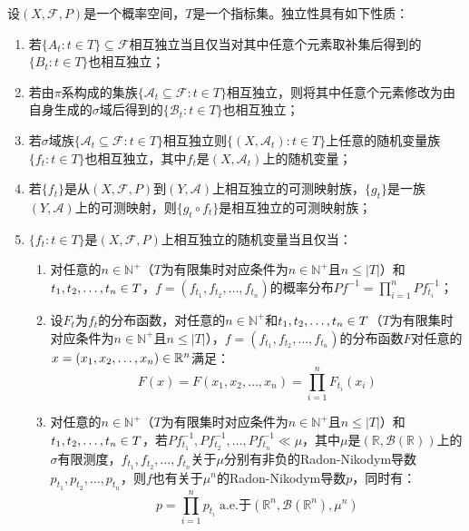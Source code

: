 \begin{property}\label{prop:Independent}
	设$(X,\mathscr{F},P)$是一个概率空间，$T$是一个指标集。独立性具有如下性质：
	\begin{enumerate}
		\item 若$\{A_t:t\in T\}\subseteq\mathscr{F}$相互独立当且仅当对其中任意个元素取补集后得到的$\{B_t:t\in T\}$也相互独立；
		\item 若由$\pi$系构成的集族$\{\mathscr{A}_t\subseteq\mathscr{F}:t\in T\}$相互独立，则将其中任意个元素修改为由自身生成的$\sigma$域后得到的$\{\mathscr{B}_t:t\in T\}$也相互独立；
		\item 若$\sigma$域族$\{\mathscr{A}_t\subseteq\mathscr{F}:t\in T\}$相互独立则$\{(X,\mathscr{A}_t):t\in T\}$上任意的随机变量族$\{f_t:t\in T\}$也相互独立，其中$f_t$是$(X,\mathscr{A}_t)$上的随机变量；
		\item 若$\{f_t\}$是从$(X,\mathscr{F},P)$到$(Y,\mathscr{A})$上相互独立的可测映射族，$\{g_t\}$是一族$(Y,\mathscr{A})$上的可测映射，则$\{g_t\circ f_t\}$是相互独立的可测映射族；
		\item $\{f_t:t\in T\}$是$(X,\mathscr{F},P)$上相互独立的随机变量当且仅当：
		\begin{enumerate}
			\item 对任意的$n\in\mathbb{N}^+$（$T$为有限集时对应条件为$n\in\mathbb{N}^+$且$n\leqslant|T|$）和$t_1, t_2, \dots, t_{n}\in T$，$f=(f_{t_1},f_{t_2},\dots,f_{t_n})$的概率分布$Pf^{-1}=\prod\limits_{i=1}^{n}Pf_{t_i}^{-1}$；
			\item 设$F_t$为$f_t$的分布函数，对任意的$n\in\mathbb{N}^+$和$t_1, t_2, \dots, t_{n}\in T$（$T$为有限集时对应条件为$n\in\mathbb{N}^+$且$n\leqslant|T|$），$f=(f_{t_1},f_{t_2},\dots,f_{t_n})$的分布函数$F$对任意的$x=(x_1, x_2, \dots, x_{n})\in\mathbb{R}^{n}$满足：
			\begin{equation*}
				F(x)=F(x_1,x_2,\dots,x_n)=\prod_{i=1}^{n}F_{t_i}(x_i)
			\end{equation*}
			\item 对任意的$n\in\mathbb{N}^+$（$T$为有限集时对应条件为$n\in\mathbb{N}^+$且$n\leqslant|T|$）和$t_1, t_2, \dots, t_{n}\in T$，若$Pf_{t_1}^{-1},Pf_{t_2}^{-1},\dots,Pf_{t_n}^{-1}\ll\mu$，其中$\mu$是$(\mathbb{R},\mathcal{B}(\mathbb{R}))$上的$\sigma$有限测度，$f_{t_1},f_{t_2},\dots,f_{t_n}$关于$\mu$分别有非负的Radon-Nikodym导数$p_{t_1},p_{t_2},\dots,p_{t_n}$，则$f$也有关于$\mu^n$的Radon-Nikodym导数$p$，同时有：
			\begin{equation*}
				p=\prod_{i=1}^{n}p_{t_i}\;\text{a.e.于}\left(\mathbb{R}^{n},\mathcal{B}(\mathbb{R}^{n}),\mu^n\right)
			\end{equation*}

\end{enumerate}
\end{enumerate}
\end{property}
